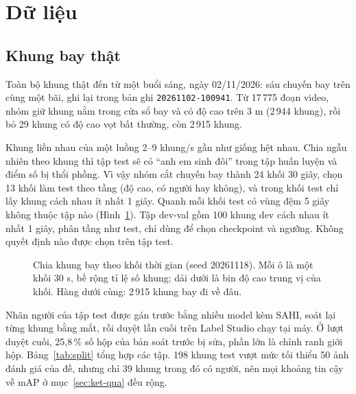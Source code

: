 \section{Dữ liệu}\label{sec:du-lieu}

\subsection{Khung bay thật}

Toàn bộ khung thật đến từ một buổi sáng, ngày 02/11/2026: sáu chuyến bay trên cùng một bãi, ghi lại trong bản ghi \texttt{20261102-100941}. Từ 17\,775 đoạn video, nhóm giữ khung nằm trong cửa sổ bay và có độ cao trên 3 m (2\,944 khung), rồi bỏ 29 khung có độ cao vọt bất thường, còn 2\,915 khung.

Khung liền nhau của một luồng 2–9 khung/s gần như giống hệt nhau. Chia ngẫu nhiên theo khung thì tập test sẽ có ``anh em sinh đôi'' trong tập huấn luyện và điểm số bị thổi phồng. Vì vậy nhóm cắt chuyến bay thành 24 khối 30 giây, chọn 13 khối làm test theo tầng (độ cao, có người hay không), và trong khối test chỉ lấy khung cách nhau ít nhất 1 giây. Quanh mỗi khối test có vùng đệm 5 giây không thuộc tập nào (Hình~\ref{fig:timeline}). Tập dev-val gồm 100 khung dev cách nhau ít nhất 1 giây, phân tầng như test, chỉ dùng để chọn checkpoint và ngưỡng. Không quyết định nào được chọn trên tập test.

\begin{figure}[!htbp]
\centering
\resizebox{\textwidth}{!}{}
\caption[Chia khung bay theo khối thời gian (seed 20261118)]{Chia khung bay theo khối thời gian (seed 20261118). Mỗi ô là một khối 30 s, bề rộng tỉ lệ số khung; dải dưới là bin độ cao trung vị của khối. Hàng dưới cùng: 2\,915 khung bay đi về đâu.}
\label{fig:timeline}
\end{figure}

Nhãn người của tập test được gán trước bằng nhiều model kèm SAHI, soát lại từng khung bằng mắt, rồi duyệt lần cuối trên Label Studio chạy tại máy. Ở lượt duyệt cuối, 25,8\,\% số hộp của bản soát trước bị sửa, phần lớn là chỉnh ranh giới hộp. Bảng~\ref{tab:split} tổng hợp các tập. 198 khung test vượt mức tối thiểu 50 ảnh đánh giá của đề, nhưng chỉ 39 khung trong đó có người, nên mọi khoảng tin cậy về mAP ở mục~\ref{sec:ket-qua} đều rộng.

